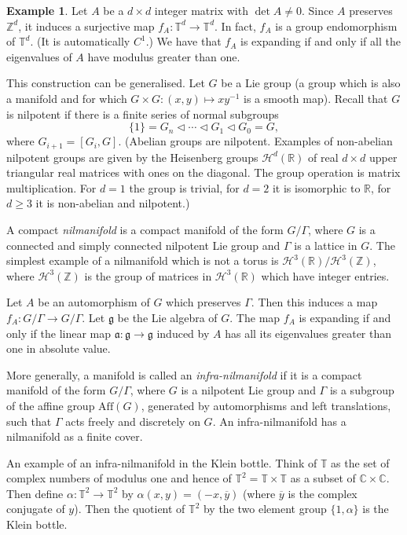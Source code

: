 \documentclass[12pt]{article}
\theoremstyle{definition}
\newtheorem{example}[theorem]{Example}
\theoremstyle{remark}
\begin{document}
\begin{example}
Let $A$ be a $d\times d$ integer matrix with $\det A \ne 0$. Since $A$ preserves $\mathbb Z^d$, it induces a surjective map $f_A : \mathbb T^d \to \mathbb T^d$. In fact, $f_A$ is a group endomorphism of $\mathbb T^d$.
(It is automatically $C^1$.)
We have that $f_A$ is expanding if and only if all the eigenvalues of $A$ have modulus greater than one.
\end{example}



\medskip
This construction can be generalised. Let $G$ be a Lie group (a group which is also a manifold and for which
$G \times G : (x,y) \mapsto xy^{-1}$ is a smooth map). Recall that $G$ is nilpotent if there is a finite series of normal subgroups
\[
\{1\} = G_n \triangleleft \cdots \triangleleft G_{1} \triangleleft G_0 = G,
\] 
where $G_{i+1}=[G_i,G]$.
(Abelian groups are nilpotent. Examples of non-abelian nilpotent groups are given by the Heisenberg groups 
$\mathcal H^d(\mathbb R)$ of real $d \times d$ upper triangular real matrices 
with ones on the diagonal. The group operation is matrix multiplication. For $d=1$ the group is trivial, for $d=2$
it is isomorphic to $\mathbb R$, for $d \ge 3$ it is non-abelian and nilpotent.)

A  compact {\it nilmanifold} is a compact manifold of the form $G/\Gamma$, where $G$ is a connected and simply connected nilpotent Lie group and $\Gamma$ is a lattice in $G$. 
The simplest example of a nilmanifold which is not a torus is
$\mathcal H^3(\mathbb R)/\mathcal H^3(\mathbb Z)$, where $\mathcal H^3(\mathbb Z)$ is the group of
matrices in $\mathcal H^3(\mathbb R)$ which have integer entries.

Let $A$ be an automorphism of $G$ which preserves $\Gamma$. Then this induces a map $f_A : G/\Gamma
\to G/\Gamma$. Let $\mathfrak g$ be the Lie algebra of $G$. The map $f_A$ is expanding 
if and only if the linear map $\mathfrak a : \mathfrak g \to \mathfrak g$ induced by $A$ has all its eigenvalues 
greater than one in absolute value. 


More generally, a manifold is called an {\it infra-nilmanifold} if it is a compact manifold of the form $G/\Gamma$, where 
$G$ is a nilpotent Lie group and $\Gamma$ is a subgroup of the affine group $\mathrm{Aff}(G)$, generated
by automorphisms and left translations, such that $\Gamma$ acts freely and discretely on $G$. An 
infra-nilmanifold has a nilmanifold as a finite cover. 

An example of an infra-nilmanifold in the Klein bottle.
Think of $\mathbb T$ as the set of complex numbers of modulus one and hence of $\mathbb T^2 = \mathbb T \times \mathbb T$ as a subset
of $\mathbb C \times \mathbb C$. Then define $\alpha : \mathbb T^2 \to \mathbb T^2$ by
$\alpha(x,y) = (-x,\overline{y})$ (where $\overline y$ is the complex conjugate of $y$). Then
the quotient of $\mathbb T^2$ by the two element group $\{1,\alpha\}$ is the Klein bottle.
\end{document}
